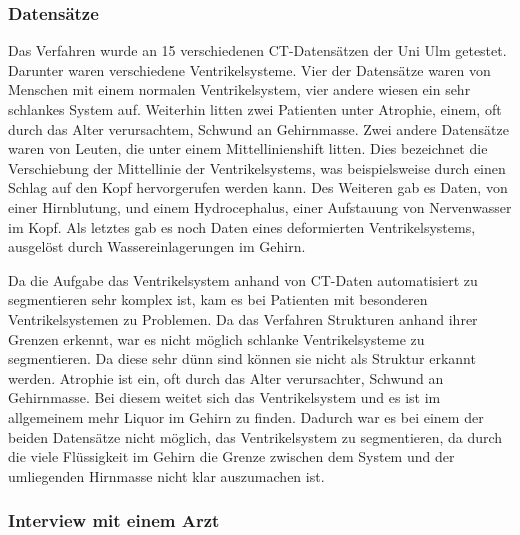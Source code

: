 \subsubsection{Datensätze}

Das Verfahren wurde an 15 verschiedenen CT-Datensätzen der Uni Ulm getestet. Darunter waren verschiedene Ventrikelsysteme.
\newline
Vier der Datensätze waren von Menschen mit einem normalen Ventrikelsystem, vier andere wiesen ein sehr schlankes System auf. Weiterhin litten zwei Patienten unter Atrophie, einem, oft durch das Alter verursachtem, Schwund an Gehirnmasse.
\newline
Zwei andere Datensätze waren von Leuten, die unter einem Mittellinienshift litten. Dies bezeichnet die Verschiebung der Mittellinie der Ventrikelsystems, was beispielsweise durch einen Schlag auf den Kopf hervorgerufen werden kann.
\newline
Des Weiteren gab es Daten, von einer Hirnblutung, und einem Hydrocephalus, einer Aufstauung von Nervenwasser im Kopf. Als letztes gab es noch Daten eines deformierten Ventrikelsystems, ausgelöst durch Wassereinlagerungen im Gehirn.


Da die Aufgabe das Ventrikelsystem anhand von CT-Daten automatisiert zu segmentieren sehr komplex ist, kam es bei Patienten mit besonderen Ventrikelsystemen zu Problemen. Da das Verfahren Strukturen anhand ihrer Grenzen erkennt, war es nicht möglich schlanke Ventrikelsysteme zu segmentieren. Da diese sehr dünn sind können sie nicht als Struktur erkannt werden.
Atrophie ist ein, oft durch das Alter verursachter, Schwund an Gehirnmasse. Bei diesem weitet sich das Ventrikelsystem und es ist im allgemeinem mehr Liquor im Gehirn zu finden. Dadurch war es bei einem der beiden Datensätze nicht möglich, das Ventrikelsystem zu segmentieren, da durch die viele Flüssigkeit im Gehirn die Grenze zwischen dem System und der umliegenden Hirnmasse nicht klar auszumachen ist.


\subsubsection{Interview mit einem Arzt}

